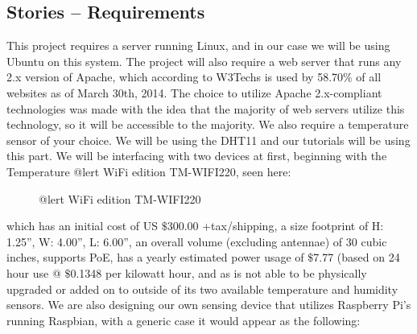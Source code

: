 \documentclass{report}
\begin{document}
\subsection*{Stories -- Requirements}
This project requires a server running Linux, and in our case we will be using Ubuntu on this system. 
The project will also require a web server that runs any 2.x version of Apache, which according to W3Techs is used by 58.70$\%$ of all websites as of March 30th, 2014.
The choice to utilize Apache 2.x-compliant technologies was made with the idea that the majority of web servers utilize this technology, so it will be accessible to the majority. 
We also require a temperature sensor of your choice.
We will be using the DHT11 and our tutorials will be using this part. 
We will be interfacing with two devices at first, beginning with the Temperature @lert WiFi edition TM-WIFI220, seen here:
\begin{figure}[H]
\caption{@lert WiFi edition TM-WIFI220}
\end{figure}
 which has an initial cost of US $\$$300.00 +tax/shipping, a size footprint of H: 1.25”, W: 4.00”, L: 6.00”, an overall volume (excluding antennae) of 30 cubic inches, supports PoE, has a yearly estimated power usage of $\$$7.77 (based on 24 hour use @ $\$$0.1348 per kilowatt hour, and as is not able to be physically upgraded or added on to outside of its two available temperature and humidity sensors.
\newline
\indent
We are also designing our own sensing device that utilizes Raspberry Pi’s running Raspbian, with a generic case it would appear as the following:
\end{document}
